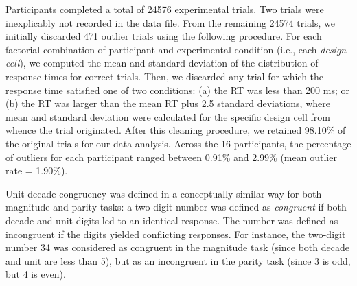 \documentclass[english,man]{apa6}
\theoremstyle{definition}
\theoremstyle{definition}
\theoremstyle{definition}
\theoremstyle{remark}
\begin{document}
Participants completed a total of 24576 experimental trials. Two trials
were inexplicably not recorded in the data file. From the remaining
24574 trials, we initially discarded 471 outlier trials using the
following procedure. For each factorial combination of participant and
experimental condition (i.e., each \emph{design cell}), we computed the
mean and standard deviation of the distribution of response times for
correct trials. Then, we discarded any trial for which the response time
satisfied one of two conditions: (a) the RT was less than 200 ms; or (b)
the RT was larger than the mean RT plus 2.5 standard deviations, where
mean and standard deviation were calculated for the specific design cell
from whence the trial originated. After this cleaning procedure, we
retained 98.10\% of the original trials for our data analysis. Across
the 16 participants, the percentage of outliers for each participant
ranged between 0.91\% and 2.99\% (mean outlier rate = 1.90\%).

Unit-decade congruency was defined in a conceptually similar way for
both magnitude and parity tasks: a two-digit number was defined as
\emph{congruent} if both decade and unit digits led to an identical
response. The number was defined as incongruent if the digits yielded
conflicting responses. For instance, the two-digit number 34 was
considered as congruent in the magnitude task (since both decade and
unit are less than 5), but as an incongruent in the parity task (since 3
is odd, but 4 is even).
\end{document}
